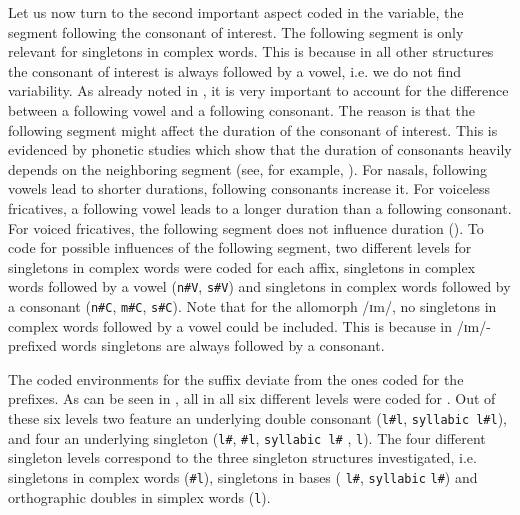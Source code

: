 Let us now turn to the second important aspect coded in the variable, the segment following the consonant of interest. The following segment is only relevant for singletons in complex words. This is because in all other structures the  consonant of interest is always followed by a vowel, i.e. we do not find variability.  
As already noted in , it is very important to account for the difference between a following vowel and a following consonant. The reason is that the following segment might affect the duration of the consonant of interest. This is evidenced by phonetic studies which show that the duration of consonants heavily depends on the neighboring segment (see, for example, \citealt{Umeda.1977}).  For nasals,  following vowels lead to shorter durations, following consonants increase it. For voiceless fricatives, a following vowel leads to a longer duration than a following consonant. For voiced fricatives, the following segment does not influence duration (\citealt[854]{Umeda.1977}). To code for possible influences of the following segment, two different levels for singletons in complex words were coded for each affix, singletons in complex words followed by a vowel (\texttt{n\#V}, \texttt{s\#V}) and singletons in complex words followed by a consonant (\texttt{n\#C}, \texttt{m\#C}, \texttt{s\#C}). Note that for the allomorph /ɪm/, no singletons in complex words followed by a vowel could be included. This is because in /ɪm/-prefixed words singletons are always followed by a consonant.


The coded environments for the suffix  deviate from the ones coded for the prefixes. 
As can be seen in , all in all six different levels were coded for . Out of these six levels two feature an underlying double consonant (\texttt{l\#l}, \texttt{syllabic l\#l}), and four an underlying singleton  (\texttt{l\#},  \texttt{\#l}, \texttt{syllabic l\#} , \texttt{l}). The four different singleton levels correspond to the three singleton structures investigated, i.e. singletons in complex words (\texttt{\#l}), singletons in bases ( \texttt{l\#}, \texttt{syllabic} \texttt{l\#}) and orthographic doubles in simplex words (\texttt{l}).

